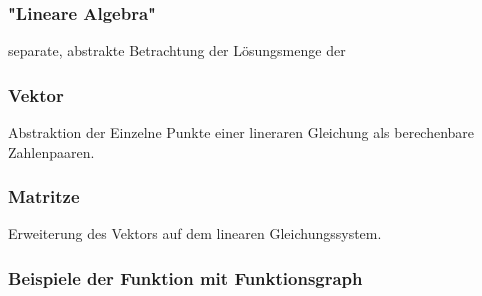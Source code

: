 \documentclass{article}
\begin{document}
    \subsubsection*{"Lineare Algebra"}
    separate, abstrakte Betrachtung der Lösungsmenge der 
    \subsubsection*{Vektor}
    Abstraktion der Einzelne Punkte einer lineraren Gleichung als berechenbare Zahlenpaaren.
    \subsubsection*{Matritze}
    Erweiterung des Vektors auf dem linearen Gleichungssystem.
    \subsubsection{Beispiele der Funktion mit Funktionsgraph}
    
\end{document}
